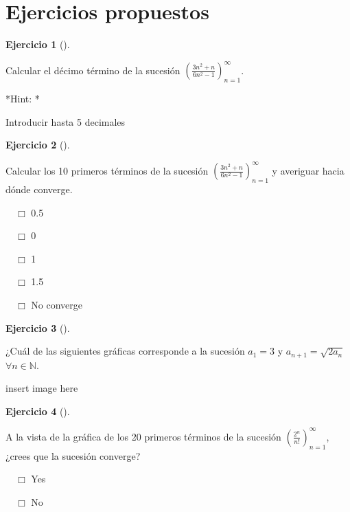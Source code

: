 \documentclass[
  a4paper,
]{scrreport}
\theoremstyle{definition}
\newtheorem{exercise}{Ejercicio}[chapter]
\theoremstyle{remark}
\begin{document}
\section{Ejercicios propuestos}\label{ejercicios-propuestos}

\begin{exercise}[]\protect\hypertarget{exr-sucesiones-propuesto-1}{}\label{exr-sucesiones-propuesto-1}

Calcular el décimo término de la sucesión
\(\left(\frac{3n^2+n}{6n^2-1}\right)_{n=1}^\infty\).

\vspace{18pt}*Hint: *

Introducir hasta 5 decimales

\end{exercise}

\begin{exercise}[]\protect\hypertarget{exr-sucesiones-propuesto-2}{}\label{exr-sucesiones-propuesto-2}

Calcular los 10 primeros términos de la sucesión
\(\left(\frac{3n^2+n}{6n^2-1}\right)_{n=1}^\infty\) y averiguar hacia
dónde converge.

${\quad\Box}$ 0.5

${\quad\Box}$ 0

${\quad\Box}$ 1

${\quad\Box}$ 1.5

${\quad\Box}$ No converge

\end{exercise}

\begin{exercise}[]\protect\hypertarget{exr-sucesiones-propuesto-3}{}\label{exr-sucesiones-propuesto-3}

¿Cuál de las siguientes gráficas corresponde a la sucesión \(a_1=3\) y
\(a_{n+1}=\sqrt{2a_n}\) \(\forall n\in\mathbb{N}\).

insert image here

\end{exercise}

\begin{exercise}[]\protect\hypertarget{exr-sucesiones-propuesto-4}{}\label{exr-sucesiones-propuesto-4}

A la vista de la gráfica de los 20 primeros términos de la sucesión
\(\left(\frac{2^n}{n!}\right)_{n=1}^\infty\), ¿crees que la sucesión
converge?

${\quad\Box}$ Yes

${\quad\Box}$ No

\end{exercise}
\end{document}

